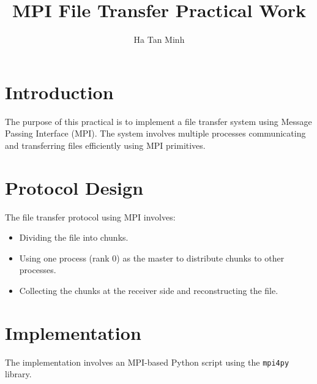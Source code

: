 \documentclass{article}
\title{MPI File Transfer Practical Work}
\author{Ha Tan Minh}
\date{}
\begin{document}
\maketitle

\section{Introduction}
The purpose of this practical is to implement a file transfer system using Message Passing Interface (MPI). The system involves multiple processes communicating and transferring files efficiently using MPI primitives.

\section{Protocol Design}
The file transfer protocol using MPI involves:
\begin{itemize}
    \item Dividing the file into chunks.
    \item Using one process (rank 0) as the master to distribute chunks to other processes.
    \item Collecting the chunks at the receiver side and reconstructing the file.
\end{itemize}


\section{Implementation}
The implementation involves an MPI-based Python script using the \texttt{mpi4py} library.
\end{document}
